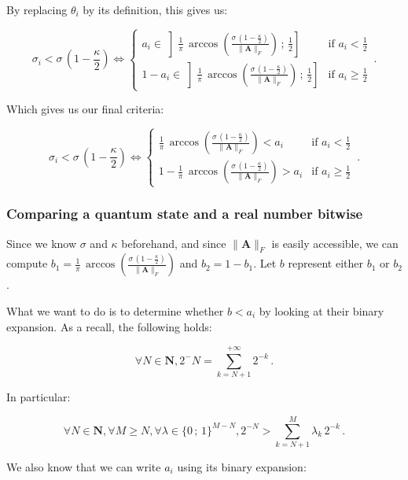 \documentclass[11pt, a4paper]{article}
\begin{document}
                By replacing \(\theta_i\) by its definition, this gives us:
                
                \[\sigma_i < \sigma\,\left(1 - \frac\kappa2\right)\iff\begin{cases}a_i\in\left]\frac1\pi\,\arccos\left(\frac{\sigma\,\left(1 - \frac\kappa2\right)}{\|\mathbf{A}\|_F}\right)\,;\,\frac12\right]&\text{if }a_i<\frac12\\1-a_i\in\left]\frac1\pi\,\arccos\left(\frac{\sigma\,\left(1 - \frac\kappa2\right)}{\|\mathbf{A}\|_F}\right)\,;\,\frac12\right]&\text{if }a_i\geqslant\frac12\end{cases}\,.\]
                
                Which gives us our final criteria:
                
                \[\sigma_i < \sigma\,\left(1 - \frac\kappa2\right)\iff\begin{cases}\frac1\pi\,\arccos\left(\frac{\sigma\,\left(1 - \frac\kappa2\right)}{\|\mathbf{A}\|_F}\right) < a_i&\text{if }a_i<\frac12\\1-\frac1\pi\,\arccos\left(\frac{\sigma\,\left(1 - \frac\kappa2\right)}{\|\mathbf{A}\|_F}\right) > a_i&\text{if }a_i\geqslant\frac12\end{cases}\,.\]
            
            \subsubsection{Comparing a quantum state and a real number bitwise}
                Since we know \(\sigma\) and \(\kappa\) beforehand, and since \(\|\mathbf{A}\|_F\) is easily accessible, we can compute \(b_1=\frac1\pi\,\arccos\left(\frac{\sigma\,\left(1 - \frac\kappa2\right)}{\|\mathbf{A}\|_F}\right)\) and \(b_2 = 1 - b_1\). Let \(b\) represent either \(b_1\) or \(b_2\).
                
                What we want to do is to determine whether \(b<a_i\) by looking at their binary expansion. As a recall, the following holds:
                
                \[\forall N\in\mathbf{N},2^-N=\sum_{k=N+1}^{+\infty}2^{-k}\,.\]
                
                In particular:
                
                \[\forall N\in\mathbf{N},\forall M\geqslant N,\forall \lambda\in\{0\,;\,1\}^{M-N},2^{-N}>\sum_{k=N+1}^M\lambda_k\,2^{-k}\,.\]
                
                We also know that we can write \(a_i\) using its binary expansion:
                
\end{document}
